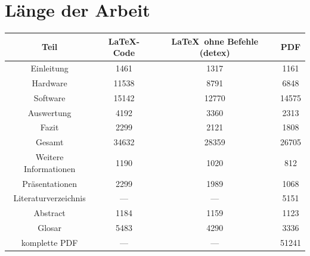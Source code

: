 \documentclass[12pt,a4paper,oneside,DIV=14]{scrartcl}
\begin{document}
\section{Länge der Arbeit}
\begin{table}[h]
	\centering
	\label{länge}
	\begin{tabular}{c|c|c|c}
	Teil		&	\LaTeX-Code & \LaTeX\ ohne Befehle (detex) & PDF \\
	\hline\hline
	Einleitung	& 1461 & 1317 & 1161\\\hline
	Hardware	 & 11538	 & 8791 & 6848\\\hline
	Software	& 15142 & 12770 & 14575	\\ \hline
	Auswertung & 4192 & 3360 & 2313 \\ \hline
	Fazit & 2299 & 2121 & 1808 \\ \hline\hline

	Gesamt	& 34632  & 28359 & 26705 \\ \hline\hline
	
	Weitere Informationen & 1190 & 1020 & 812 \\ \hline
	Präsentationen & 2299 & 1989 & 1068 \\ \hline
	Literaturverzeichnis & --- & --- & 5151 \\\hline
	Abstract & 1184 & 1159 & 1123 \\\hline
	Glosar & 5483 & 4290 & 3336 \\ \hline	\hline
	komplette PDF & --- & --- & 51241 \\
	\end{tabular}
\end{table}
\end{document}
